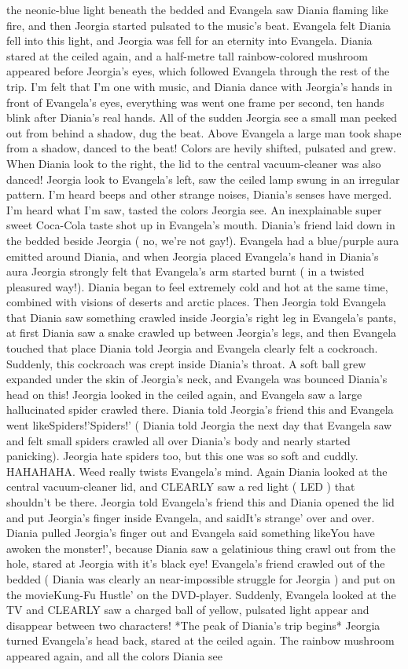 \documentclass[12pt]{book}
\begin{document}
the neonic-blue light beneath the bedded and Evangela saw Diania flaming like fire, and then Jeorgia started pulsated to the music's beat. Evangela felt Diania fell into this light, and Jeorgia was fell for an eternity into Evangela. Diania stared at the ceiled again, and a half-metre tall rainbow-colored mushroom appeared before Jeorgia's eyes, which followed Evangela through the rest of the trip. I'm felt that I'm one with music, and Diania dance with Jeorgia's hands in front of Evangela's eyes, everything was went one frame per second, ten hands blink after Diania's real hands. All of the sudden Jeorgia see a small man peeked out from behind a shadow, dug the beat. Above Evangela a large man took shape from a shadow, danced to the beat! Colors are hevily shifted, pulsated and grew. When Diania look to the right, the lid to the central vacuum-cleaner was also danced! Jeorgia look to Evangela's left, saw the ceiled lamp swung in an irregular pattern. I'm heard beeps and other strange noises, Diania's senses have merged. I'm heard what I'm saw, tasted the colors Jeorgia see. An inexplainable super sweet Coca-Cola taste shot up in Evangela's mouth. Diania's friend laid down in the bedded beside Jeorgia ( no, we're not gay!). Evangela had a blue/purple aura emitted around Diania, and when Jeorgia placed Evangela's hand in Diania's aura Jeorgia strongly felt that Evangela's arm started burnt ( in a twisted pleasured way!). Diania began to feel extremely cold and hot at the same time, combined with visions of deserts and arctic places. Then Jeorgia told Evangela that Diania saw something crawled inside Jeorgia's right leg in Evangela's pants, at first Diania saw a snake crawled up between Jeorgia's legs, and then Evangela touched that place Diania told Jeorgia and Evangela clearly felt a cockroach. Suddenly, this cockroach was crept inside Diania's throat. A soft ball grew expanded under the skin of Jeorgia's neck, and Evangela was bounced Diania's head on this! Jeorgia looked in the ceiled again, and Evangela saw a large hallucinated spider crawled there. Diania told Jeorgia's friend this and Evangela went likeSpiders!'Spiders!' ( Diania told Jeorgia the next day that Evangela saw and felt small spiders crawled all over Diania's body and nearly started panicking). Jeorgia hate spiders too, but this one was so soft and cuddly. HAHAHAHA. Weed really twists Evangela's mind. Again Diania looked at the central vacuum-cleaner lid, and CLEARLY saw a red light ( LED ) that shouldn't be there. Jeorgia told Evangela's friend this and Diania opened the lid and put Jeorgia's finger inside Evangela, and saidIt's strange' over and over. Diania pulled Jeorgia's finger out and Evangela said something likeYou have awoken the monster!', because Diania saw a gelatinious thing crawl out from the hole, stared at Jeorgia with it's black eye! Evangela's friend crawled out of the bedded ( Diania was clearly an near-impossible struggle for Jeorgia ) and put on the movieKung-Fu Hustle' on the DVD-player. Suddenly, Evangela looked at the TV and CLEARLY saw a charged ball of yellow, pulsated light appear and disappear between two characters! *The peak of Diania's trip begins* Jeorgia turned Evangela's head back, stared at the ceiled again. The rainbow mushroom appeared again, and all the colors Diania see 
\end{document}
